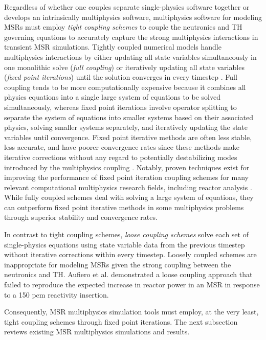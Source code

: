 Regardless of whether one couples separate single-physics software together or develops an
intrinsically multiphysics software, multiphysics software for modeling \glspl{MSR} must employ
\textit{tight coupling schemes} to couple the neutronics
and \gls{TH} governing equations to accurately capture the strong
multiphysics interactions in transient \gls{MSR} simulations. Tightly coupled
numerical models handle multiphysics interactions by either updating all state
variables simultaneously in one monolithic solve (\textit{full coupling}) or
iteratively updating all state variables (\textit{fixed point iterations})
until the solution converges in every timestep \cite{keyes_multiphysics_2013}.
Full coupling tends to be more computationally expensive because it combines
all physics equations into a single large system of equations to be solved
simultaneously, whereas fixed point iterations involve operator splitting to
separate the system of equations into smaller systems based on their associated
physics, solving smaller systems separately, and iteratively updating the state
variables until convergence. Fixed point iterative methods are often less
stable, less accurate, and have poorer
convergence rates since these methods make iterative corrections
without any regard to potentially destabilizing modes introduced by the
multiphysics coupling \cite{keyes_multiphysics_2013}. Notably, proven
techniques exist for improving the performance of fixed point iteration
coupling schemes for many relevant computational multiphysics research fields,
including reactor analysis \cite{ragusa_consistent_2009}. While fully coupled
schemes deal with solving a large system of equations, they can outperform
fixed point iterative methods in some multiphysics problems through superior
stability and convergence rates. 

In contrast to tight coupling schemes, \textit{loose coupling schemes}
solve each set of single-physics equations using state variable
data from the previous timestep without iterative corrections within every
timestep. Loosely coupled schemes are inappropriate for modeling \glspl{MSR}
given the strong coupling between the neutronics and \gls{TH}.
Aufiero et al. \cite{aufiero_development_2014} demonstrated a loose coupling
approach that failed to reproduce the expected increase in reactor power
in an \gls{MSR} in response to a 150 pcm reactivity insertion.

Consequently, MSR multiphysics simulation tools must employ, at
the very least, tight coupling schemes through fixed point iterations. The
next subsection reviews existing \gls{MSR} multiphysics simulations and results.

